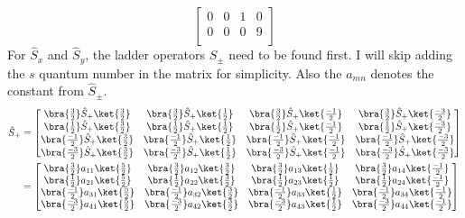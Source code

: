 \documentclass{article}
\begin{document}
\begin{enumerate}
\begin{equation}
\begin{bmatrix}
				0 & 0 &	1 & 0 \\
				0 & 0 & 0 & 9 \\
			\end{bmatrix}
		\end{equation}
		For $\hat{S}_x$ and $\hat{S}_y$, the ladder operators $\hat{S}_\pm$ need to be found first. I will skip adding the $s$ quantum number in the matrix for simplicity. Also the $a_{mn}$ denotes the constant from $\hat{S}_\pm$.
		\begin{align}
			\hat{S}_+ &=
			\begin{bmatrix}
				\bra{\frac{3}{2}} \hat{S}_+ \ket{\frac{3}{2}} & \bra{\frac{3}{2}} \hat{S}_+ \ket{\frac{1}{2}} &
				\bra{\frac{3}{2}} \hat{S}_+ \ket{\frac{-1}{2}} & \bra{\frac{3}{2}} \hat{S}_+ \ket{\frac{-3}{2}} \\
				\bra{\frac{1}{2}} \hat{S}_+ \ket{\frac{3}{2}} & \bra{\frac{1}{2}} \hat{S}_+ \ket{\frac{1}{2}} &
				\bra{\frac{1}{2}} \hat{S}_+ \ket{\frac{-1}{2}} & \bra{\frac{1}{2}} \hat{S}_+ \ket{\frac{-3}{2}} \\
				\bra{\frac{-1}{2}} \hat{S}_+ \ket{\frac{3}{2}} & \bra{\frac{-1}{2}} \hat{S}_+ \ket{\frac{1}{2}} &
				\bra{\frac{-1}{2}} \hat{S}_+ \ket{\frac{-1}{2}} & \bra{\frac{-1}{2}} \hat{S}_+ \ket{\frac{-3}{2}} \\
				\bra{\frac{-3}{2}} \hat{S}_+ \ket{\frac{3}{2}} & \bra{\frac{-3}{2}} \hat{S}_+ \ket{\frac{1}{2}} &
				\bra{\frac{-3}{2}} \hat{S}_+ \ket{\frac{-1}{2}} & \bra{\frac{-3}{2}} \hat{S}_+ \ket{\frac{-3}{2}} \\
			\end{bmatrix} \\
			&=
			\begin{bmatrix}
				\bra{\frac{3}{2}} a_{11} \ket{\frac{5}{2}} & \bra{\frac{3}{2}} a_{12} \ket{\frac{3}{2}} &
				\bra{\frac{3}{2}} a_{13} \ket{\frac{1}{2}} & \bra{\frac{3}{2}} a_{14} \ket{\frac{-1}{2}} \\
				\bra{\frac{1}{2}} a_{21} \ket{\frac{5}{2}} & \bra{\frac{1}{2}} a_{22} \ket{\frac{3}{2}} &
				\bra{\frac{1}{2}} a_{23} \ket{\frac{1}{2}} & \bra{\frac{1}{2}} a_{24} \ket{\frac{-1}{2}} \\
				\bra{\frac{-1}{2}} a_{31} \ket{\frac{5}{2}} & \bra{\frac{-1}{2}} a_{32} \ket{\frac{3}{2}} &
				\bra{\frac{-1}{2}} a_{33} \ket{\frac{1}{2}} & \bra{\frac{-1}{2}} a_{34} \ket{\frac{-1}{2}} \\
				\bra{\frac{-3}{2}} a_{41} \ket{\frac{5}{2}} & \bra{\frac{-3}{2}} a_{42} \ket{\frac{3}{2}} &
				\bra{\frac{-3}{2}} a_{43} \ket{\frac{1}{2}} & \bra{\frac{-3}{2}} a_{44} \ket{\frac{-1}{2}} \\

\end{bmatrix}
\end{align}
\end{enumerate}
\end{document}
